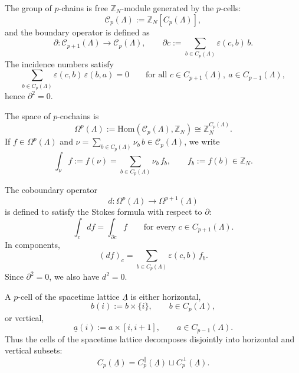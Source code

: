 \documentclass[dvipsnames,a4paper]{article}
\numberwithin{equation}{section}
\theoremstyle{definition}
\theoremstyle{remark}
\newcommand{\Hom}{\mathrm{Hom}}
\begin{document}
The group of \(p\)-chains is free $\mathbb Z_N$-module generated by the $p$-cells:
\begin{equation}
	\mathcal C_p(\Lambda):=\mathbb Z_N[C_p(\Lambda)],
	\label{eq:chain-group}
\end{equation}
and the boundary operator is defined as
\begin{equation}
	\partial:\mathcal C_{p+1}(\Lambda)\to \mathcal C_p(\Lambda),
	\qquad
	\partial c:=\sum_{b\in C_p(\Lambda)}\varepsilon(c,b)\,b.
	\label{eq:boundary}
\end{equation}
The incidence numbers satisfy
\begin{equation}
	\sum_{b\in C_p(\Lambda)}\varepsilon(c,b)\,\varepsilon(b,a)=0
	\qquad
	\text{for all } c\in C_{p+1}(\Lambda),\ a\in C_{p-1}(\Lambda),
	\label{eq:incidence-identity}
\end{equation}
hence \(\partial^2=0\).

The space of \(p\)-cochains is
\begin{equation}
	\Omega^p(\Lambda):=\Hom(\mathcal C_p(\Lambda),\mathbb Z_N)
	\cong \mathbb Z_N^{C_p(\Lambda)}.
	\label{eq:cochain-group}
\end{equation}
If \(f\in \Omega^p(\Lambda)\) and $\nu=\sum_{b\in C_p(\Lambda)}\nu_b\,b\in \mathcal C_p(\Lambda)$,
we write
\begin{equation}
	\int_\nu f:=f(\nu)=\sum_{b\in C_p(\Lambda)}\nu_b\,f_b,
	\qquad
	f_b:=f(b)\in \mathbb Z_N.
	\label{eq:pairing}
\end{equation}

The coboundary operator
\begin{equation}
	d:\Omega^p(\Lambda)\to \Omega^{p+1}(\Lambda)
\end{equation}
is defined to satisfy the Stokes formula with respect to \(\partial\):
\begin{equation}
	\int_c df=\int_{\partial c} f
	\qquad
	\text{for every } c\in C_{p+1}(\Lambda).
	\label{eq:d-def}
\end{equation}
In components,
\begin{equation}
	(df)_c=\sum_{b\in C_p(\Lambda)}\varepsilon(c,b)\,f_b.
	\label{eq:d-components}
\end{equation}
Since \(\partial^2=0\), we also have \(d^2=0\).

A \(p\)-cell of the spacetime lattice \(\underline\Lambda\) is either horizontal,
\begin{equation}
	b(i):=b\times\{i\},
	\qquad
	b\in C_p(\Lambda),
	\label{eq:horizontalCell}
\end{equation}
or vertical,
\begin{equation}
	\underline a(i):=a\times[i,i+1],
	\qquad
	a\in C_{p-1}(\Lambda).
	\label{eq:verticalCell}
\end{equation}
Thus the cells of the spacetime lattice decomposes disjointly into horizontal and vertical subsets:
\begin{equation}
	C_p(\underline\Lambda)
	=
	C_p^{\parallel}(\underline\Lambda) \sqcup C_p^{\perp}(\underline\Lambda).
\end{equation}
\end{document}
